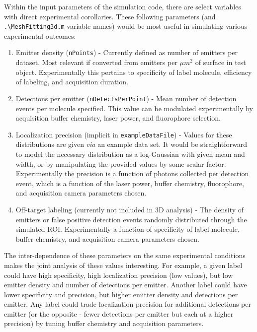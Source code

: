 \documentclass[10pt,a4paper]{article}
\begin{document}
Within the input parameters of the simulation code, there are select variables with direct experimental corollaries. These following parameters (and \texttt{.\textbackslash MeshFitting3d.m} variable names) would be most useful in simulating various experimental outcomes:

\begin{enumerate}
	\item Emitter density (\texttt{nPoints}) - Currently defined as number of emitters per dataset.  Most relevant if converted from emitters per $\mu m^{2}$ of surface in test object.  Experimentally this pertains to specificity of label molecule, efficiency of labeling, and acquisition duration. 
	\item Detections per emitter (\texttt{nDetectsPerPoint}) - Mean number of detection events per molecule specified.  This value can be modulated experimentally by acquisition buffer chemistry, laser power, and fluorophore selection.
	\item Localization precision (implicit in \texttt{exampleDataFile}) - Values for these distributions are given \textit{via} an example data set.  It would be straightforward to model the necessary distribution as a log-Gaussian with given mean and width, or by manipulating the provided values by some scalar factor.  Experimentally the precision is a function of photons collected per detection event, which is a function of the laser power, buffer chemistry, fluorophore, and acquisition camera parameters chosen. 
	\item Off-target labeling (currently not included in 3D analysis) - The density of emitters or false positive detection events randomly distributed through the simulated ROI.  Experimentally a function of specificity of label molecule, buffer chemistry, and acquisition camera parameters chosen. 
\end{enumerate}

The inter-dependence of these parameters on the same experimental conditions makes the joint analysis of these values interesting.  For example, a given label could have high specificity, high localization precision (low values), but low emitter density and number of detections per emitter.  Another label could have lower specificity and precision, but higher emitter density and detections per emitter.  Any label could trade localization precision for additional detections per emitter (or the opposite - fewer detections per emitter but each at a higher precision) by tuning buffer chemistry and acquisition parameters.  
\end{document}
